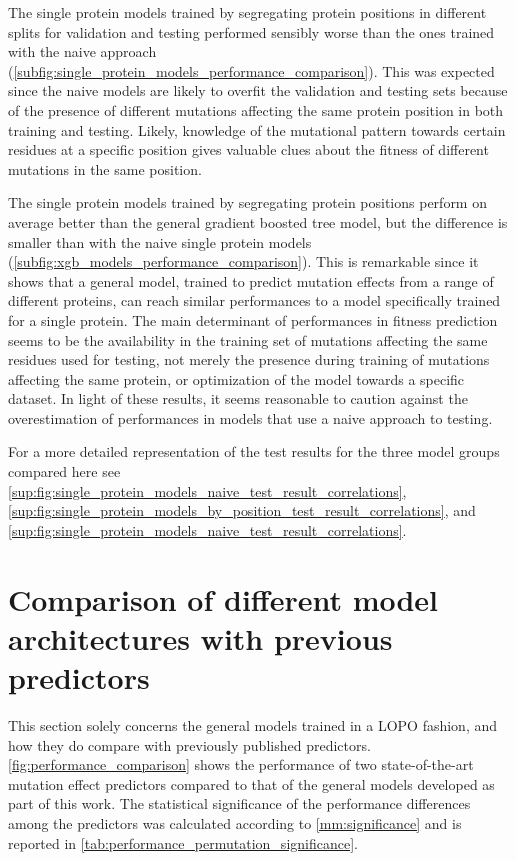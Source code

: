 The single protein models trained by segregating protein positions in different splits for validation and testing performed sensibly worse than the ones trained with the naive approach (\autoref{subfig:single_protein_models_performance_comparison}).
This was expected since the naive models are likely to overfit the validation and testing sets because of the presence of different mutations affecting the same protein position in both training and testing.
Likely, knowledge of the mutational pattern towards certain residues at a specific position gives valuable clues about the fitness of different mutations in the same position.

The single protein models trained by segregating protein positions perform on average better than the general gradient boosted tree model, but the difference is smaller than with the naive single protein models (\autoref{subfig:xgb_models_performance_comparison}).
This is remarkable since it shows that a general model, trained to predict mutation effects from a range of different proteins, can reach similar performances to a model specifically trained for a single protein.
The main determinant of performances in fitness prediction seems to be the availability in the training set of mutations affecting the same residues used for testing, not merely the presence during training of mutations affecting the same protein, or optimization of the model towards a specific dataset.
In light of these results, it seems reasonable to caution against the overestimation of performances in models that use a naive approach to testing.

For a more detailed representation of the test results for the three model groups compared here see \autoref{sup:fig:single_protein_models_naive_test_result_correlations}, \autoref{sup:fig:single_protein_models_by_position_test_result_correlations}, and \autoref{sup:fig:single_protein_models_naive_test_result_correlations}.

\section{Comparison of different model architectures with previous predictors}
This section solely concerns the general models trained in a LOPO fashion, and how they do compare with previously published predictors.
\autoref{fig:performance_comparison} shows the performance of two state-of-the-art mutation effect predictors compared to that of the general models developed as part of this work.
The statistical significance of the performance differences among the predictors was calculated according to \autoref{mm:significance} and is reported in \autoref{tab:performance_permutation_significance}.

